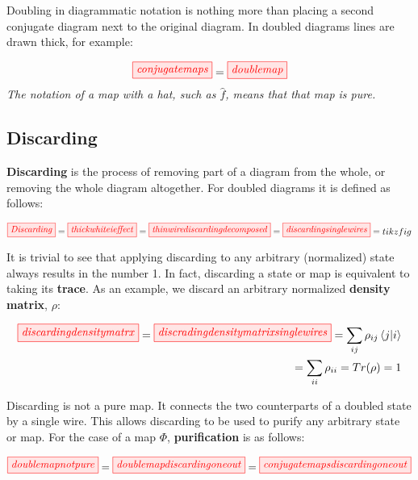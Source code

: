 \documentclass[]{article}
\begin{document}
Doubling in diagrammatic notation is nothing more than placing a second conjugate diagram next to the original diagram. In doubled diagrams lines are drawn thick, for example:

\begin{equation}
\tikzfig{conjugatemaps} = \tikzfig{doublemap}
\end{equation}
\textit{The notation of a map with a hat, such as $\hat{f}$, means that that map is pure.}


\subsection{Discarding}
\label{discarding}

\textbf{Discarding} is the process of removing part of a diagram from the whole, or removing the whole diagram altogether. For doubled diagrams it is defined as follows:

\begin{equation}
\label{discarding}
\tikzfig{Discarding} = \tikzfig{thickwhiteieffect} = \tikzfig{thinwirediscardingdecomposed} = \tikzfig{discardingsinglewires} = tikzfig
\end{equation}

It is trivial to see that applying discarding to any arbitrary (normalized) state always results in the number 1. In fact, discarding a state or map is equivalent to taking its \textbf{trace}. As an example, we discard an arbitrary normalized \textbf{density matrix}, $\rho$:

\begin{equation}
\begin{split}
\tikzfig{discardingdensitymatrx} = \tikzfig{discradingdensitymatrixsinglewires} = \sum\limits_{ij} \rho_{ij} \bra{j}\ket{i} \\ = \sum\limits_{ii} \rho_{ii} = Tr(\rho) = 1
\end{split}
\end{equation}

Discarding is not a pure map. It connects the two counterparts of a doubled state by a single wire. This allows discarding to be used to purify any arbitrary state or map. For the case of a map $\Phi$, \textbf{purification} is as follows:

\begin{equation}
\tikzfig{doublemapnotpure} = \tikzfig{doublemapdiscardingoneout} = \tikzfig{conjugatemapsdiscardingoneout}
\end{equation}
\end{document}
